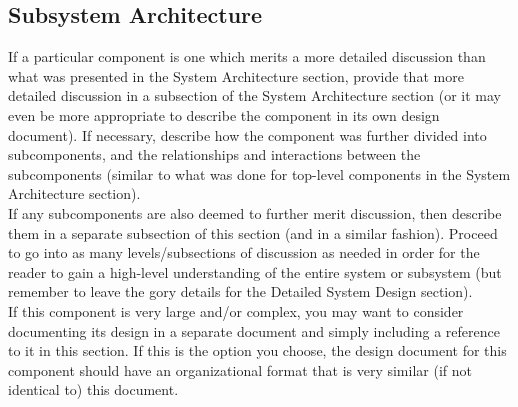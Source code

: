\documentclass{FastFyp}
\begin{document}
\subsection{Subsystem Architecture}
If a particular component is one which merits a more detailed discussion than what was presented in the System Architecture section, provide that more detailed discussion in a subsection of the System Architecture section (or it may even be more appropriate to describe the component in its own design document). If necessary, describe how the component was further divided into subcomponents, and the relationships and interactions between the subcomponents (similar to what was done for top-level components in the System Architecture section).\\
If any subcomponents are also deemed to further merit discussion, then describe them in a separate subsection of this section (and in a similar fashion). Proceed to go into as many levels/subsections of discussion as needed in order for the reader to gain a high-level understanding of the entire system or subsystem (but remember to leave the gory details for the Detailed System Design section).\\
If this component is very large and/or complex, you may want to consider documenting its design in a separate document and simply including a reference to it in this section. If this is the option you choose, the design document for this component should have an organizational format that is very similar (if not identical to) this document.
\end{document}
